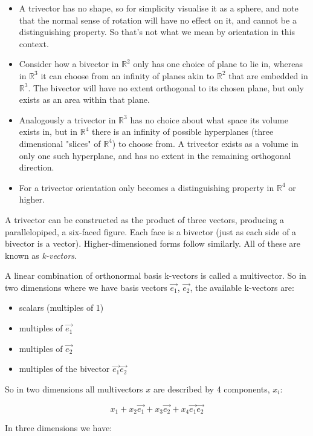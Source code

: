 \begin{itemize}
    \item A trivector has no shape, so for simplicity visualise it as a sphere, and note that the normal sense of rotation will have no effect on it, and cannot be a distinguishing property. So that's not what we mean by orientation in this context.
    \item Consider how a bivector in $\mathbb{R}^2$ only has one choice of plane to lie in, whereas in $\mathbb{R}^3$ it can choose from an infinity of planes akin to $\mathbb{R}^2$ that are embedded in $\mathbb{R}^3$. The bivector will have no extent orthogonal to its chosen plane, but only exists as an area within that plane.
    \item Analogously a trivector in $\mathbb{R}^3$ has no choice about what space its volume exists in, but in $\mathbb{R}^4$ there is an infinity of possible hyperplanes (three dimensional "slices" of $\mathbb{R}^4$) to choose from. A trivector exists as a volume in only one such hyperplane, and has no extent in the remaining orthogonal direction.
    \item For a trivector orientation only becomes a distinguishing property in $\mathbb{R}^4$ or higher.
\end{itemize}

A trivector can be constructed as the product of three vectors, producing a parallelopiped, a six-faced figure. Each face is a bivector (just as each side of a bivector is a vector). Higher-dimensioned forms follow similarly. All of these are known as \textit{k-vectors}.

A linear combination of orthonormal basis k-vectors is called a multivector. So in two dimensions where we have basis vectors $\vec{e_1}$, $\vec{e_2}$, the available k-vectors are:

\begin{itemize}    
    \item scalars (multiples of 1)
    \item multiples of $\vec{e_1}$
    \item multiples of $\vec{e_2}$
    \item multiples of the bivector $\vec{e_1}\vec{e_2}$
\end{itemize}

So in two dimensions all multivectors $x$ are described by 4 components, $x_i$:

$$x_1 + x_2\vec{e_1} + x_3\vec{e_2} + x_4\vec{e_1}\vec{e_2}$$

In three dimensions we have:

